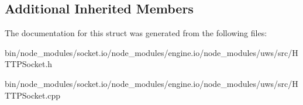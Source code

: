 \subsection*{Additional Inherited Members}


The documentation for this struct was generated from the following files\+:\begin{DoxyCompactItemize}
\item 
bin/node\+\_\+modules/socket.\+io/node\+\_\+modules/engine.\+io/node\+\_\+modules/uws/src/H\+T\+T\+P\+Socket.\+h\item 
bin/node\+\_\+modules/socket.\+io/node\+\_\+modules/engine.\+io/node\+\_\+modules/uws/src/H\+T\+T\+P\+Socket.\+cpp\end{DoxyCompactItemize}
